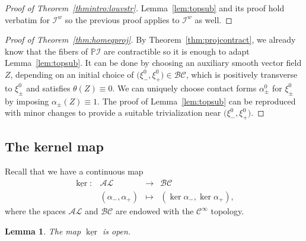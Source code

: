 \documentclass[letterpaper, 11pt]{article}
\numberwithin{equation}{section}
\newtheorem{lem}[thm]{Lemma}
\begin{document}
\begin{proof}[Proof of Theorem~\ref{thmintro:louvstr}] Lemma~\ref{lem:topsub} and its proof hold verbatim for $\mathcal{I}^w$ so the previous proof applies to $\mathcal{I}^w$ as well.
\end{proof}

\begin{proof}[Proof of Theorem~\ref{thm:homeqproj}]
By Theorem~\ref{thm:projcontract}, we already know that the fibers of $\mathbb{P}\mathcal{I}$ are contractible so it is enough to adapt Lemma~\ref{lem:topsub}. It can be done by choosing an auxiliary smooth vector field $Z$, depending on an initial choice of $\big(\xi^0_-, \xi^0_+\big) \in \mathcal{BC}$, which is positively transverse to $\xi^0_\pm$ and satisfies $\theta(Z) \equiv 0$. We can uniquely choose contact forms $\alpha^0_\pm$ for $\xi^0_\pm$ by imposing $\alpha_\pm(Z) \equiv 1$. The proof of Lemma~\ref{lem:topsub} can be reproduced with minor changes to provide a suitable trivialization near $\big(\xi^0_-, \xi^0_+\big)$.
\end{proof}

		\subsection{The kernel map}

Recall that we have a continuous map
$$ \begin{array}{rccc}
\underline{\ker}: & \mathcal{AL} & \longrightarrow & \mathcal{BC} \\
& (\alpha_-, \alpha_+) & \longmapsto & (\ker \alpha_-, \ker \alpha_+ ),
\end{array}$$
where the spaces $\mathcal{AL}$ and $\mathcal{BC}$ are endowed with the $\mathcal{C}^\infty$ topology.

\begin{lem} \label{lem:keropen}
The map $\underline{\ker}$ is open.
\end{lem}
\end{document}
